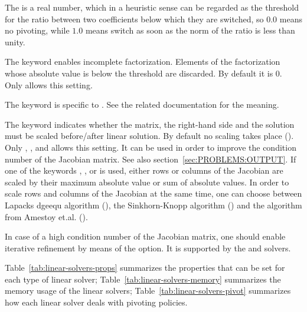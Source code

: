 The  is a real number, which in a heuristic sense 
can be regarded as the threshold for the ratio between two coefficients 
below which they are switched, so $ 0.0 $ means no pivoting, 
while $ 1.0 $ means switch as soon as the norm of the ratio 
is less than unity.

The keyword  enables incomplete factorization.
Elements of the factorization whose absolute value is below
the  threshold are discarded.
By default it is 0.
Only  allows this setting.

The keyword  is specific to .
See the related documentation for the meaning.

The keyword  indicates whether the matrix, the right-hand side and the solution
must be scaled before/after linear solution.
By default no scaling takes place ().
Only , ,  and  allows this setting.
It can be used in order to improve the condition number of the Jacobian matrix.
See also section~\ref{sec:PROBLEMS:OUTPUT}. If one of the keywords ,
,  or  is used, either rows or columns
of the Jacobian are scaled by their maximum absolute value or sum of absolute values.
In order to scale rows and columns of the Jacobian at the same time, one can choose
between Lapacks dgeequ algorithm (), the Sinkhorn-Knopp algorithm
\cite{SINKHORN-KNOPP-1967} () and the algorithm from Amestoy et.al.
\cite{PATRICK-AMESTOY-2008} ().

In case of a high condition number of the Jacobian matrix, one should enable iterative
refinement by means of the  option. It is supported by the  and
 solvers.

Table~\ref{tab:linear-solvers-props} summarizes the properties that can be set
for each type of linear solver; Table~\ref{tab:linear-solvers-memory}
summarizes  the memory usage of the linear solvers;
Table~\ref{tab:linear-solvers-pivot}
summarizes how each linear solver deals with pivoting policies.

